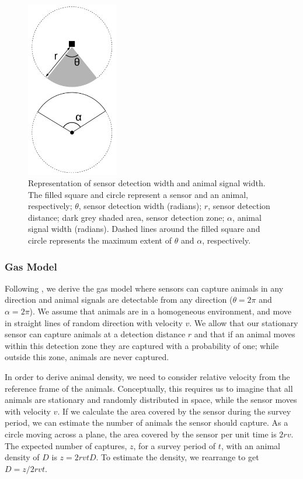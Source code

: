 \documentclass[a4paper,10pt,reqno,oneside]{amsart}
\begin{document}
\begin{figure}[t]
        \centering
	\includegraphics[width=4cm]{imgs/angleDefinitions.pdf}

\caption{Representation of sensor detection width and animal signal width. The filled square and circle represent a sensor and an animal, respectively; $\theta$, sensor detection width (radians); $r$, sensor detection distance; dark grey shaded area, sensor detection zone; $\alpha$, animal signal width (radians). Dashed lines around the filled square and circle represents the maximum extent of $\theta$ and $\alpha$, respectively.} 
\label{f:AngleDef}
\end{figure}



\subsubsection*{Gas Model}

Following \cite{yapp1956theory}, we derive the gas model where sensors can capture animals in any direction and animal signals are detectable from any direction ($ \theta =  2\pi$ and $ \alpha =  2\pi$). We assume that animals are in a homogeneous environment, and move in straight lines of random direction with velocity $v$. We allow that our stationary sensor can capture animals at a detection distance $r$ and that if an animal moves within this detection zone they are captured with a probability of one; while outside this zone, animals are never captured.

In order to derive animal density, we need to consider relative velocity from the reference frame of the animals. Conceptually, this requires us to imagine that all animals are stationary and randomly distributed in space, while the sensor moves with velocity $v$. If we calculate the area covered by the sensor during the survey period, we can estimate the number of animals the sensor should capture. As a circle moving across a plane, the area covered by the sensor per unit time is $2rv$. The expected number of captures, $z$, for a survey period of $t$, with an animal density of $D$ is $z = 2rvtD$. To estimate the density, we rearrange to get $D = z/2rvt$.
\end{document}
